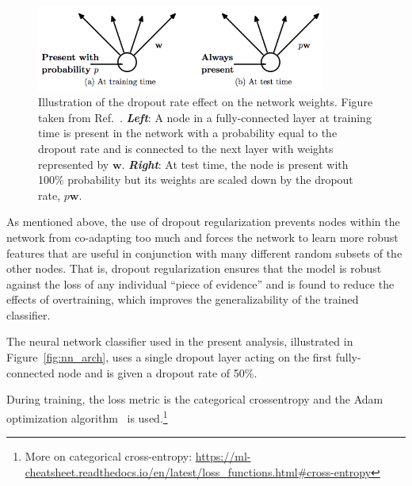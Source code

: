 \begin{figure}[!htb]
    \begin{center}
        \includegraphics[width=0.85\textwidth]{figures/search_hh/mva/dropout_weight_scaling}
        \caption{
            Illustration of the dropout rate effect on the network weights. Figure taken from Ref.~\cite{JMLRDropout}.
            \textit{\textbf{Left}}: A node in a fully-connected layer at training time is present in the network with
                a probability equal to the dropout rate and is connected to the next layer with weights represented by $\bm{w}$.
            \textit{\textbf{Right}}: At test time, the node is present with 100\% probability but its weights are scaled down by the
                dropout rate, $p\bm{w}$.
        }
        \label{fig:dropout_weight_scaling}
    \end{center}
\end{figure}

\noindent
As mentioned above, the use of dropout regularization prevents nodes within the network from co-adapting
too much and forces the network to learn more robust features that are useful in conjunction with many 
different random subsets of the other nodes.
That is, dropout regularization ensures that the model is robust against the loss of any individual
``piece of evidence'' and is found to reduce the effects of overtraining, which improves the generalizability
of the trained classifier.

The neural network classifier used in the present analysis, illustrated in Figure~\ref{fig:nn_arch},
uses a single dropout layer acting on the first fully-connected node and is given a dropout rate of 50\%.

During training, the loss metric is the categorical crossentropy and the Adam optimization algorithm~\cite{AdamOptimizer} is used.\footnote{More
on categorical cross-entropy: \href{https://ml-cheatsheet.readthedocs.io/en/latest/loss_functions.html\#cross-entropy}
{https://ml-cheatsheet.readthedocs.io/en/latest/loss\_functions.html\#cross-entropy}}


%
%
